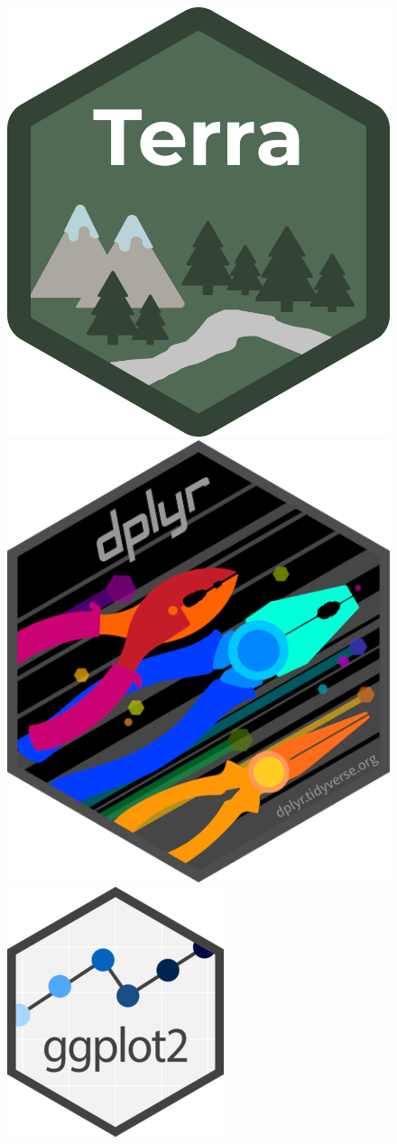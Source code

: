 \documentclass[aspectratio=169]{beamer}
\begin{document}
\begin{frame}
\begin{columns}
\begin{column}{0.5\linewidth}
\begin{figure}[h]
                \includegraphics[width=0.25\linewidth]{./logos/terra_logo.png}\\
                \includegraphics[width=0.24\linewidth]{./logos/dplyr.png}
                \includegraphics[width=0.24\linewidth]{./logos/ggplot2_logo.png}
            \end{figure}
        \end{column}
    \end{columns}
\end{frame}
\end{document}
